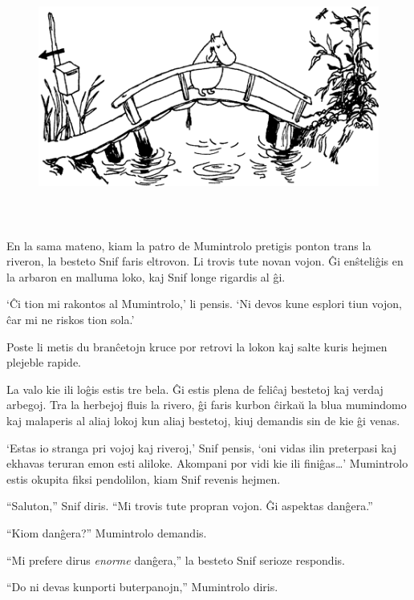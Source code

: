 \begin{figure}[htbp]
\centering
\includegraphics[width=450pt,height=237pt]{1-1.png}
\caption{}
\label{1-1}
\end{figure}

\noindent En la sama mateno, kiam la patro de Mumintrolo pretigis ponton trans la riveron, la besteto Snif faris eltrovon. Li trovis tute novan vojon. Ĝi enŝteliĝis en la arbaron en malluma loko, kaj Snif longe rigardis al ĝi.

`Ĉi tion mi rakontos al Mumintrolo,' li pensis. `Ni devos kune esplori tiun vojon, ĉar mi ne riskos tion sola.'

Poste li metis du branĉetojn kruce por retrovi la lokon kaj salte kuris hejmen plejeble rapide.

La valo kie ili loĝis estis tre bela. Ĝi estis plena de feliĉaj bestetoj kaj verdaj arbegoj. Tra la herbejoj fluis la rivero, ĝi faris kurbon ĉirkaŭ la blua mumindomo kaj malaperis al aliaj lokoj kun aliaj bestetoj, kiuj demandis sin de kie ĝi venas.

`Estas io stranga pri vojoj kaj riveroj,' Snif pensis, `oni vidas ilin preterpasi kaj ekhavas teruran emon esti aliloke. Akompani por vidi kie ili finiĝas{\ldots}'
\sectionbreak
Mumintrolo estis okupita fiksi pendolilon, kiam Snif revenis hejmen.

``Saluton,'' Snif diris. ``Mi trovis tute propran vojon. Ĝi aspektas danĝera.''

``Kiom danĝera?'' Mumintrolo demandis.

``Mi prefere dirus \emph{enorme} danĝera,'' la besteto Snif serioze respondis.

``Do ni devas kunporti buterpanojn,'' Mumintrolo diris.

